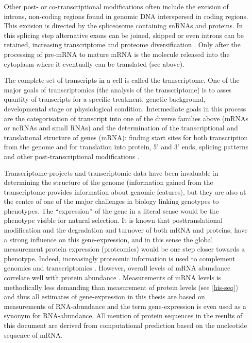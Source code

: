Other post- or co-transcriptional modifications often include the
excision of introns, non-coding regions found in genomic DNA
interspersed in coding regions. This excision is directed by the
spliceosome containing snRNAs and proteins. In this splicing step
alternative exons can be joined, skipped or even introns can be
retained, increasing transcriptome and proteome diversification
\cite{pmid17158149}. Only after the processing of pre-mRNA to mature
mRNA is the molecule released into the cytoplasm where it eventually
can be translated (see above).

The complete set of transcripts in a cell is called the
transcriptome. One of the major goals of transcriptomics (the analysis
of the transcriptome) is to asses quantity of transcripts for a
specific treatment, genetic background, developmental stage or
physiological condition. Intermediate goals in this process are the
categorisation of transcript into one of the diverse families above
(mRNAs or ncRNAs and small RNAs) and the determination of the
transcriptional and translational structure of genes (mRNA): finding
start sites for both transcription from the genome and for translation
into protein, 5' and 3' ends, splicing patterns and other
post-transcriptional modifications \cite{pmid19015660}.

Transcriptome-projects and transcriptomic data have been invaluable in
determining the structure of the genome (information gained from the
transcriptome provides information about genomic features), but they
are also at the centre of one of the major challenges in biology
linking genotypes to phenotypes. The ``expression'' of the gene in a
literal sense would be the phenotype visible for natural selection. It
is known that posttranslational modification and the degradation and
turnover of both mRNA and proteins, have a strong influence on this
gene-expression, and in this sense the global measurement protein
expression (proteomics) would be one step closer towards a
phenotype. Indeed, increasingly proteomic information is used to
complement genomics and transcriptomics \cite{pmid20121477,
  pmid20237107}. However, overall levels of mRNA abundance correlate
well with protein abundance \cite{pmid21593866}. Measurements of mRNA
levels is methodically less demanding than measurement of protein
levels (see \ref{his-seq}) and thus all estimates of gene-expression
in this thesis are based on measurements of RNA-abundance and the term
gene-expression is even used as a synonym for RNA-abundance. All
mention of protein sequences in the results of this document are
derived from computational prediction based on the nucleotide sequence
of mRNA.

